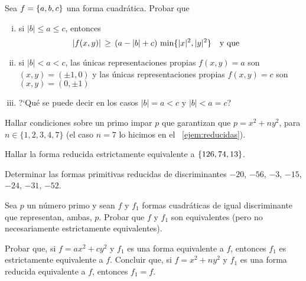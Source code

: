 \begin{ejerReducidas}\label{ejer:reducidas:cota}
	Sea $f=\left\{a,b,c\right\}$ una forma cuadr\'atica. Probar que
	\begin{enumerate}[(i)]
		\item\label{item:ejer:reducidas:cota:i}
			si $|b|\leq a\leq c$, entonces
			\begin{displaymath}
				|f(x,y)|\,\geq\,
					(a-|b|+c)\, \min\{|x|^2,|y|^2\}
				\quad\text{y que}\quad
			\end{displaymath}
		\item\label{item:ejer:reducidas:cota:ii}
			si $|b|<a<c$,
			las \'unicas representaciones propias
			$f(x,y)=a$ son $(x,y)=(\pm 1,0)$ y
			las \'unicas representaciones propias
			$f(x,y)=c$ son $(x,y)=(0,\pm 1)$
		\item\label{item:ejer:reducidas:cota:iii}
			?`Qu\'e se puede decir en los casos $|b|=a<c$ y
			$|b|<a=c$?
	\end{enumerate}
\end{ejerReducidas}

\begin{ejerReducidas}
	Hallar condiciones sobre un primo impar $p$ que garantizan
	que $p=x^2+ny^2$, para $n\in\{1,2,3,4,7\}$ (el caso
	$n=7$ lo hicimos en el \ejemname~\ref{ejem:reducidas}).
\end{ejerReducidas}

\begin{ejerReducidas}
	Hallar la forma reducida estrictamente equivalente a
	$\left\{126,74,13\right\}$.
\end{ejerReducidas}

\begin{ejerReducidas}\label{ejer:reducidas:varios}
	Determinar las formas primitivas reducidas de discriminantes
	$-20$, $-56$, $-3$, $-15$, $-24$, $-31$, $-52$.
\end{ejerReducidas}

\begin{ejerReducidas}\label{ejer:reducidas:representaciones}
	Sea $p$ un n\'umero primo y sean $f$ y $f_1$ formas
	cuadr\'aticas de igual discriminante que representan,
	ambas, $p$. Probar que $f$ y $f_1$ son equivalentes
	(pero no necesariamente estrictamente equivalentes).
\end{ejerReducidas}

\begin{ejerReducidas}\label{ejer:reducidas:representaciones:bis}
	Probar que, si $f=ax^2+cy^2$ y $f_1$ es una forma
	equivalente a $f$, entonces $f_1$ es estrictamente
	equivalente a $f$. Concluir que, si $f=x^2+ny^2$ y
	$f_1$ es una forma reducida equivalente a $f$, entonces
	$f_1=f$.
\end{ejerReducidas}

